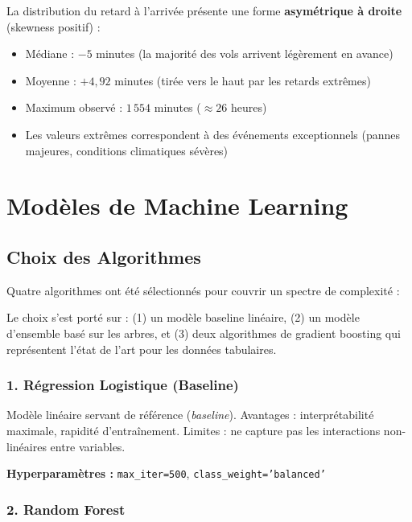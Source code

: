 \documentclass[12pt,a4paper]{article}
\begin{document}
La distribution du retard à l'arrivée présente une forme \textbf{asymétrique à droite} 
(skewness positif) :
\begin{itemize}[leftmargin=*]
  \item Médiane : $-5$ minutes (la majorité des vols arrivent légèrement en avance)
  \item Moyenne : $+4{,}92$ minutes (tirée vers le haut par les retards extrêmes)
  \item Maximum observé : $1\,554$ minutes ($\approx 26$ heures)
  \item Les valeurs extrêmes correspondent à des événements exceptionnels (pannes majeures, 
        conditions climatiques sévères)
\end{itemize}

\newpage
\section{Modèles de Machine Learning}

\subsection{Choix des Algorithmes}

Quatre algorithmes ont été sélectionnés pour couvrir un spectre de complexité :

\begin{infobox}
  Le choix s'est porté sur : (1) un modèle baseline linéaire, (2) un modèle 
  d'ensemble basé sur les arbres, et (3) deux algorithmes de gradient boosting 
  qui représentent l'état de l'art pour les données tabulaires.
\end{infobox}

\subsubsection{1. Régression Logistique (Baseline)}

Modèle linéaire servant de référence (\textit{baseline}). Avantages : 
interprétabilité maximale, rapidité d'entraînement. Limites : ne capture pas 
les interactions non-linéaires entre variables.

\textbf{Hyperparamètres :} \texttt{max\_iter=500}, \texttt{class\_weight='balanced'}

\subsubsection{2. Random Forest}
\end{document}
